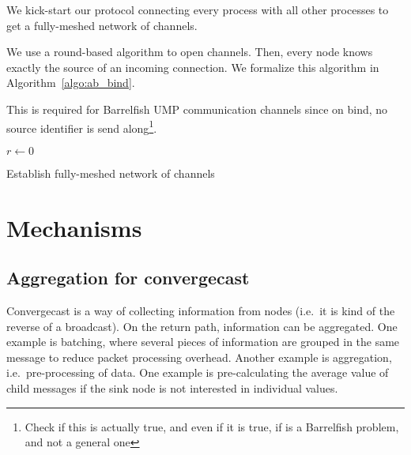 \documentclass{article}
\begin{document}
We kick-start our protocol connecting every process with all other
processes to get a fully-meshed network of channels.

We use a round-based algorithm to open channels. Then, every node
knows exactly the source of an incoming connection. We formalize this
algorithm in Algorithm~\ref{algo:ab_bind}.

This is required for Barrelfish UMP communication channels since on
bind, no source identifier is send along\footnote{Check if this is
  actually true, and even if it is true, if is a Barrelfish problem,
  and not a general one}.

\begin{algorithm}[H]
  \BlankLine
  \BlankLine
  $r \leftarrow 0$\;
  \caption{Establish fully-meshed network of channels}
  \label{algo:ab_bind}
\end{algorithm}

\section{Mechanisms}

\subsection{Aggregation for convergecast}

Convergecast is a way of collecting information from nodes (i.e.\ it
is kind of the reverse of a broadcast). On the return path,
information can be aggregated. One example is batching, where several
pieces of information are grouped in the same message to reduce packet
processing overhead. Another example is aggregation, i.e.\
pre-processing of data. One example is pre-calculating the average
value of child messages if the sink node is not interested in
individual values.
\end{document}
